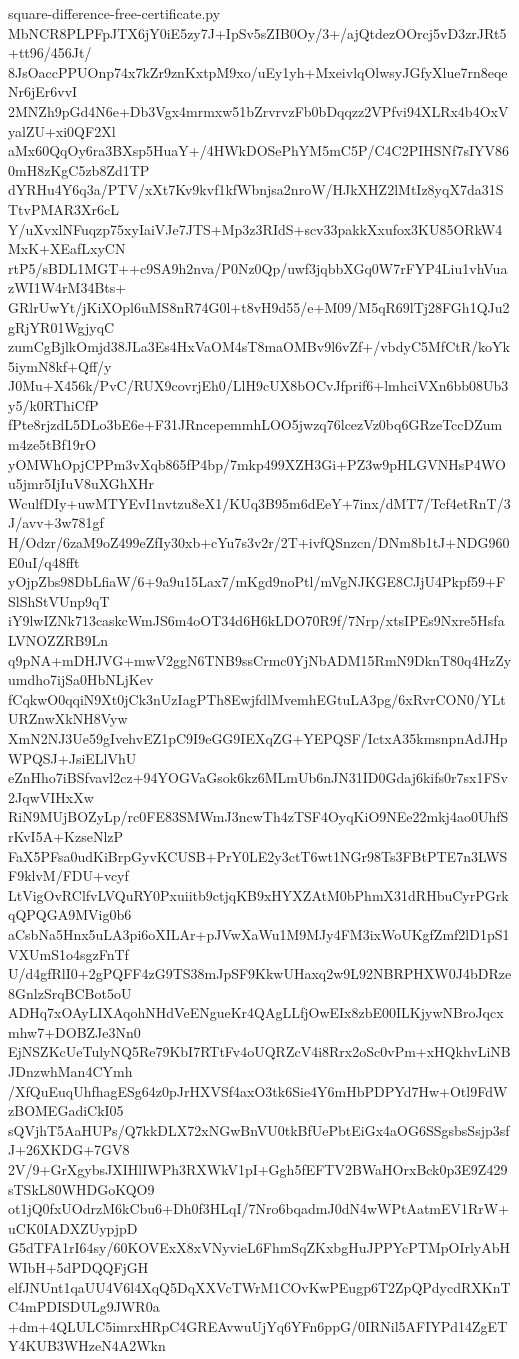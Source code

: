 \documentclass[11pt]{article}
\theoremstyle{definition}
\theoremstyle{remark}
\begin{document}
\begin{filecontents*}[overwrite]{square-difference-free-certificate.py}
MbNCR8PLPFpJTX6jY0iE5zy7J+IpSv5sZIB0Oy/3+/ajQtdezOOrcj5vD3zrJRt5+tt96/456Jt/
8JsOaccPPUOnp74x7kZr9znKxtpM9xo/uEy1yh+MxeivlqOlwsyJGfyXlue7rn8eqeNr6jEr6vvI
2MNZh9pGd4N6e+Db3Vgx4mrmxw51bZrvrvzFb0bDqqzz2VPfvi94XLRx4b4OxVyalZU+xi0QF2Xl
aMx60QqOy6ra3BXsp5HuaY+/4HWkDOSePhYM5mC5P/C4C2PIHSNf7sIYV860mH8zKgC5zb8Zd1TP
dYRHu4Y6q3a/PTV/xXt7Kv9kvf1kfWbnjsa2nroW/HJkXHZ2lMtIz8yqX7da31STtvPMAR3Xr6cL
Y/uXvxlNFuqzp75xyIaiVJe7JTS+Mp3z3RIdS+scv33pakkXxufox3KU85ORkW4MxK+XEafLxyCN
rtP5/sBDL1MGT++c9SA9h2nva/P0Nz0Qp/uwf3jqbbXGq0W7rFYP4Liu1vhVuazWI1W4rM34Bts+
GRlrUwYt/jKiXOpl6uMS8nR74G0l+t8vH9d55/e+M09/M5qR69lTj28FGh1QJu2gRjYR01WgjyqC
zumCgBjlkOmjd38JLa3Es4HxVaOM4sT8maOMBv9l6vZf+/vbdyC5MfCtR/koYk5iymN8kf+Qff/y
J0Mu+X456k/PvC/RUX9covrjEh0/LlH9cUX8bOCvJfprif6+lmhciVXn6bb08Ub3y5/k0RThiCfP
fPte8rjzdL5DLo3bE6e+F31JRncepemmhLOO5jwzq76lcezVz0bq6GRzeTccDZumm4ze5tBf19rO
yOMWhOpjCPPm3vXqb865fP4bp/7mkp499XZH3Gi+PZ3w9pHLGVNHsP4WOu5jmr5IjIuV8uXGhXHr
WculfDIy+uwMTYEvI1nvtzu8eX1/KUq3B95m6dEeY+7inx/dMT7/Tcf4etRnT/3J/avv+3w781gf
H/Odzr/6zaM9oZ499eZfIy30xb+cYu7s3v2r/2T+ivfQSnzcn/DNm8b1tJ+NDG960E0uI/q48fft
yOjpZbs98DbLfiaW/6+9a9u15Lax7/mKgd9noPtl/mVgNJKGE8CJjU4Pkpf59+FSlShStVUnp9qT
iY9lwIZNk713caskcWmJS6m4oOT34d6H6kLDO70R9f/7Nrp/xtsIPEs9Nxre5HsfaLVNOZZRB9Ln
q9pNA+mDHJVG+mwV2ggN6TNB9ssCrmc0YjNbADM15RmN9DknT80q4HzZyumdho7ijSa0HbNLjKev
fCqkwO0qqiN9Xt0jCk3nUzIagPTh8EwjfdlMvemhEGtuLA3pg/6xRvrCON0/YLtURZnwXkNH8Vyw
XmN2NJ3Ue59gIvehvEZ1pC9I9eGG9IEXqZG+YEPQSF/IctxA35kmsnpnAdJHpWPQSJ+JsiELlVhU
eZnHho7iBSfvavl2cz+94YOGVaGsok6kz6MLmUb6nJN31ID0Gdaj6kifs0r7sx1FSv2JqwVIHxXw
RiN9MUjBOZyLp/rc0FE83SMWmJ3ncwTh4zTSF4OyqKiO9NEe22mkj4ao0UhfSrKvI5A+KzseNlzP
FaX5PFsa0udKiBrpGyvKCUSB+PrY0LE2y3ctT6wt1NGr98Ts3FBtPTE7n3LWSF9klvM/FDU+vcyf
LtVigOvRClfvLVQuRY0Pxuiitb9ctjqKB9xHYXZAtM0bPhmX31dRHbuCyrPGrkqQPQGA9MVig0b6
aCsbNa5Hnx5uLA3pi6oXILAr+pJVwXaWu1M9MJy4FM3ixWoUKgfZmf2lD1pS1VXUmS1o4sgzFnTf
U/d4gfRlI0+2gPQFF4zG9TS38mJpSF9KkwUHaxq2w9L92NBRPHXW0J4bDRze8GnlzSrqBCBot5oU
ADHq7xOAyLIXAqohNHdVeENgueKr4QAgLLfjOwEIx8zbE00ILKjywNBroJqcxmhw7+DOBZJe3Nn0
EjNSZKcUeTulyNQ5Re79KbI7RTtFv4oUQRZcV4i8Rrx2oSc0vPm+xHQkhvLiNBJDnzwhMan4CYmh
/XfQuEuqUhfhagESg64z0pJrHXVSf4axO3tk6Sie4Y6mHbPDPYd7Hw+Otl9FdWzBOMEGadiCkI05
sQVjhT5AaHUPs/Q7kkDLX72xNGwBnVU0tkBfUePbtEiGx4aOG6SSgsbsSsjp3sfJ+26XKDG+7GV8
2V/9+GrXgybsJXIHlIWPh3RXWkV1pI+Ggh5fEFTV2BWaHOrxBck0p3E9Z429sTSkL80WHDGoKQO9
ot1jQ0fxUOdrzM6kCbu6+Dh0f3HLqI/7Nro6bqadmJ0dN4wWPtAatmEV1RrW+uCK0IADXZUypjpD
G5dTFA1rI64sy/60KOVExX8xVNyvieL6FhmSqZKxbgHuJPPYcPTMpOIrlyAbHWIbH+5dPDQQFjGH
elfJNUnt1qaUU4V6l4XqQ5DqXXVcTWrM1COvKwPEugp6T2ZpQPdycdRXKnTC4mPDISDULg9JWR0a
+dm+4QLULC5imrxHRpC4GREAvwuUjYq6YFn6ppG/0IRNil5AFIYPd14ZgETY4KUB3WHzeN4A2Wkn

\end{filecontents*}
\end{document}
